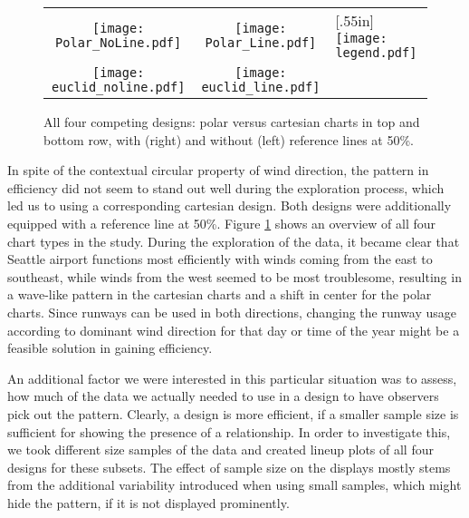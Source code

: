 \begin{figure}[htbp] %
 \hspace{-.1in}
   \begin{tabular}{ccl}
   \texttt{[image: Polar\_NoLine.pdf]} &  \hspace{-.3in}
   \texttt{[image: Polar\_Line.pdf]}  &  \hspace{-.2in} \multirow{2}{*}[.55in]{  \texttt{[image: legend.pdf]}} \\
   \texttt{[image: euclid\_noline.pdf]} & \hspace{-.3in}
   \texttt{[image: euclid\_line.pdf]}
   \end{tabular}
\vspace{-.2in}
   \caption{All four competing designs: polar versus cartesian charts in top and bottom row, with (right) and without (left) reference lines at 50\%. }
   \label{layouts}
\end{figure}

In spite of the contextual circular property of wind direction, the pattern in efficiency did not seem to stand out well during the exploration process, which led us to using a corresponding  cartesian design. Both designs were additionally equipped with a reference line at 50\%. 
Figure \ref{layouts} shows an overview of all four chart types in the study. During the exploration of the data, it became clear that Seattle airport functions most efficiently with winds coming from the east to southeast, while winds from the west seemed to be most troublesome, resulting in a wave-like pattern in the cartesian charts and a shift in center for the polar charts. Since runways can be used in both directions, changing the runway usage according to dominant wind direction for that day or time of the year might be a feasible solution in gaining efficiency. 

An additional factor we were interested in this particular situation was to assess, how much of the data we actually needed to use in a design to have observers pick out the pattern. Clearly, a design is more efficient, if a smaller sample size is sufficient for showing the presence of a relationship. In order to investigate this, we took different size samples of the data and created lineup plots of all four designs for these subsets. The effect of sample size on the displays mostly stems from the additional variability introduced when using small samples, which might hide the pattern, if it is not displayed prominently. 

